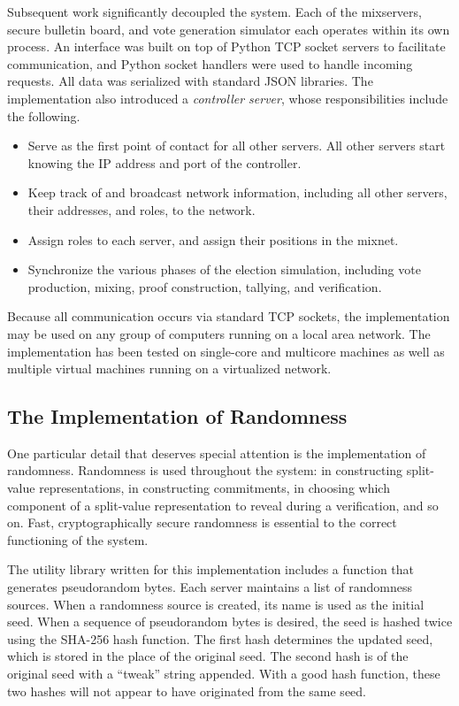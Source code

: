 Subsequent work \cite{marco} significantly decoupled the system. Each of the mixservers, secure bulletin board, and vote generation simulator each operates within its own process. An interface was built on top of Python TCP socket servers to facilitate communication, and Python socket handlers were used to handle incoming requests. All data was serialized with standard JSON libraries. The implementation also introduced  a \emph{controller server}, whose responsibilities include the following.
\begin{itemize}
\item Serve as the first point of contact for all other servers. All other servers start knowing the IP address and port of the controller.
\item Keep track of and broadcast network information, including all other servers, their addresses, and roles, to the network.
\item Assign roles to each server, and assign their positions in the mixnet.
\item Synchronize the various phases of the election simulation, including vote production, mixing, proof construction, tallying, and verification.
\end{itemize}

Because all communication occurs via standard TCP sockets, the implementation may be used on any group of computers running on a local area network. The implementation has been tested on single-core and multicore machines as well as multiple virtual machines running on a virtualized network.

\subsection{The Implementation of Randomness} \label{sv:implementation:random}

One particular detail that deserves special attention is the implementation of randomness. Randomness is used throughout the system: in constructing split-value representations, in constructing commitments, in choosing which component of a split-value representation to reveal during a verification, and so on. Fast, cryptographically secure randomness is essential to the correct functioning of the system.

The utility library written for this implementation includes a function that generates pseudorandom bytes. Each server maintains a list of randomness sources. When a randomness source is created, its name is used as the initial seed. When a sequence of pseudorandom bytes is desired, the seed is hashed twice using the SHA-256 hash function. The first hash determines the updated seed, which is stored in the place of the original seed. The second hash is of the original seed with a ``tweak'' string appended. With a good hash function, these two hashes will not appear to have originated from the same seed.

